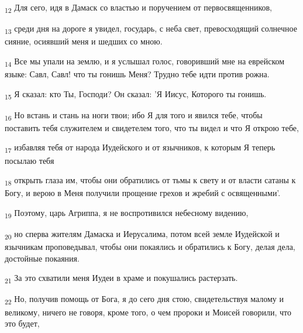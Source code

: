 \begin{tcolorbox}
\textsubscript{12} Для сего, идя в Дамаск со властью и поручением от первосвященников,
\end{tcolorbox}
\begin{tcolorbox}
\textsubscript{13} среди дня на дороге я увидел, государь, с неба свет, превосходящий солнечное сияние, осиявший меня и шедших со мною.
\end{tcolorbox}
\begin{tcolorbox}
\textsubscript{14} Все мы упали на землю, и я услышал голос, говоривший мне на еврейском языке: Савл, Савл! что ты гонишь Меня? Трудно тебе идти против рожна.
\end{tcolorbox}
\begin{tcolorbox}
\textsubscript{15} Я сказал: кто Ты, Господи? Он сказал: 'Я Иисус, Которого ты гонишь.
\end{tcolorbox}
\begin{tcolorbox}
\textsubscript{16} Но встань и стань на ноги твои; ибо Я для того и явился тебе, чтобы поставить тебя служителем и свидетелем того, что ты видел и что Я открою тебе,
\end{tcolorbox}
\begin{tcolorbox}
\textsubscript{17} избавляя тебя от народа Иудейского и от язычников, к которым Я теперь посылаю тебя
\end{tcolorbox}
\begin{tcolorbox}
\textsubscript{18} открыть глаза им, чтобы они обратились от тьмы к свету и от власти сатаны к Богу, и верою в Меня получили прощение грехов и жребий с освященными'.
\end{tcolorbox}
\begin{tcolorbox}
\textsubscript{19} Поэтому, царь Агриппа, я не воспротивился небесному видению,
\end{tcolorbox}
\begin{tcolorbox}
\textsubscript{20} но сперва жителям Дамаска и Иерусалима, потом всей земле Иудейской и язычникам проповедывал, чтобы они покаялись и обратились к Богу, делая дела, достойные покаяния.
\end{tcolorbox}
\begin{tcolorbox}
\textsubscript{21} За это схватили меня Иудеи в храме и покушались растерзать.
\end{tcolorbox}
\begin{tcolorbox}
\textsubscript{22} Но, получив помощь от Бога, я до сего дня стою, свидетельствуя малому и великому, ничего не говоря, кроме того, о чем пророки и Моисей говорили, что это будет,
\end{tcolorbox}
